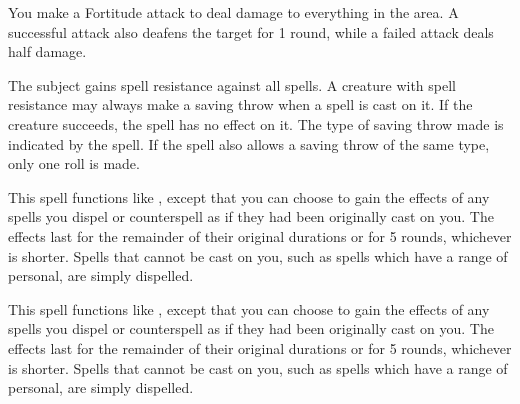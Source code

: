 \spelleffect You make a Fortitude attack to deal damage to everything in the area. A successful attack also deafens the target for 1 round, while a failed attack deals half damage.

\spelldur{\durshort}
\spelleffect The subject gains spell resistance against all spells.
\spellnotes A creature with spell resistance may always make a saving throw when a spell is cast on it. If the creature succeeds, the spell has no effect on it. The type of saving throw made is indicated by the spell. If the spell also allows a saving throw of the same type, only one roll is made.

\spelleffect This spell functions like , except that you can choose to gain the effects of any spells you dispel or counterspell as if they had been originally cast on you. The effects last for the remainder of their original durations or for 5 rounds, whichever is shorter. Spells that cannot be cast on you, such as spells which have a range of personal, are simply dispelled.

\spelleffect This spell functions like , except that you can choose to gain the effects of any spells you dispel or counterspell as if they had been originally cast on you. The effects last for the remainder of their original durations or for 5 rounds, whichever is shorter. Spells that cannot be cast on you, such as spells which have a range of personal, are simply dispelled.

